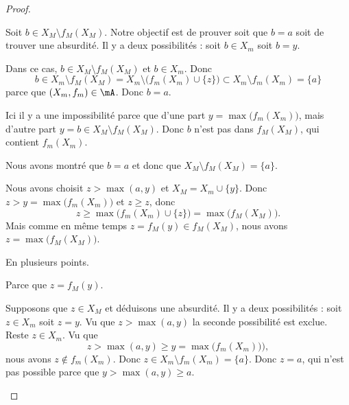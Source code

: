 \begin{proof}
\begin{subproof}
\begin{subproof}
			Soit \( b\in X_M\setminus f_M(X_M)\). Notre objectif est de prouver soit que \( b=a\) soit de trouver une absurdité. Il y a deux possibilités : soit \( b\in X_m\) soit \( b=y\).
			\begin{subproof}
				\spitem[Si \( b\in X_m\)]
				Dans ce cas, \( b\in X_M\setminus f_M(X_M)\) et \( b\in X_m\). Donc
				\begin{equation}
					b\in X_m\setminus f_M(X_M)=X_m\setminus \big( f_m(X_m)\cup \{ z \} \big)\subset X_m\setminus f_m(X_m)=\{a  \}
				\end{equation}
				parce que \( (X_m,f_m)\in\mA\). Donc \( b=a\).

				\spitem[Si \( b=y\)]
				Ici il y a une impossibilité parce que d'une part \( y=\max\big( f_m(X_m) \big)\), mais d'autre part \( y=b\in X_M\setminus f_M(X_M)\). Donc \( b\) n'est pas dans \( f_M(X_M)\), qui contient \( f_m(X_m)\).
			\end{subproof}
			Nous avons montré que \( b=a\) et donc que \( X_M\setminus f_M(X_M)=\{ a \}\).

			\spitem[\( z=\max\big( f_M(X_M) \big)\)]
			Nous avons choisit \( z>\max(a,y)\) et \( X_M=X_m\cup\{ y \}\). Donc \( z>y=\max\big( f_m(X_m) \big)\) et \( z\geq z\), donc
			\begin{equation}
				z\geq \max\big( f_m(X_m)\cup\{ z \} \big)=\max\big( f_M(X_M) \big).
			\end{equation}
			Mais comme en même temps \( z=f_M(y)\in f_M(X_M)\), nous avons \( z=\max\big( f_M(X_M) \big)\).

			\spitem[\( f_M(X_M)\setminus X_M=\lbrace z\rbrace\)]
			En plusieurs points.
			\begin{subproof}
				\spitem[\( z\in f_M(X_M)\)]
				Parce que \( z=f_M(y)\).

				\spitem[\( z\not\in X_M\)]
				Supposons que \( z\in X_M\) et déduisons une absurdité. Il y a deux possibilités : soit \( z\in X_m\) soit \( z=y\). Vu que \( z>\max(a,y)\) la seconde possibilité est exclue. Reste \( z\in X_m\). Vu que
				\begin{equation}
					z>\max(a,y)\geq y=\max\big( f_m(X_m) \big)),
				\end{equation}
				nous avons \( z\not\in f_m(X_m)\). Donc \( z\in X_m\setminus f_m(X_m)=\{ a \}\). Donc \( z=a\), qui n'est pas possible parce que \( y>\max(a,y)\geq a\).


\end{subproof}
\end{subproof}
\end{subproof}
\end{proof}
